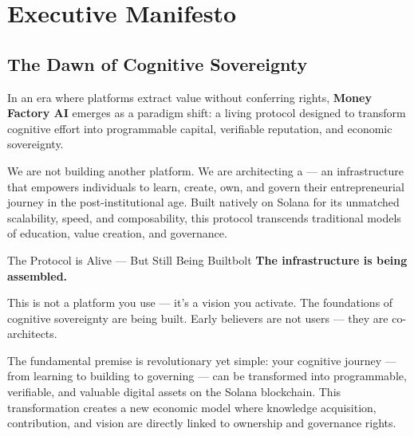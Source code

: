 
\section{Executive Manifesto}


\subsection*{The Dawn of Cognitive Sovereignty}

In an era where platforms extract value without conferring rights, \textbf{Money Factory AI} emerges as a paradigm shift: a living protocol designed to transform cognitive effort into programmable capital, verifiable reputation, and economic sovereignty.

We are not building another platform. We are architecting a  — an infrastructure that empowers individuals to learn, create, own, and govern their entrepreneurial journey in the post-institutional age. Built natively on Solana for its unmatched scalability, speed, and composability, this protocol transcends traditional models of education, value creation, and governance.

\begin{mfai-box}{The Protocol is Alive — But Still Being Built}{bolt}
\faBolt\quad \textbf{The infrastructure is being assembled.}

This is not a platform you use — it's a vision you activate. The foundations of cognitive sovereignty are being built. Early believers are not users — they are co-architects.
\end{mfai-box}

The fundamental premise is revolutionary yet simple: your cognitive journey — from learning to building to governing — can be transformed into programmable, verifiable, and valuable digital assets on the Solana blockchain. This transformation creates a new economic model where knowledge acquisition, contribution, and vision are directly linked to ownership and governance rights.

